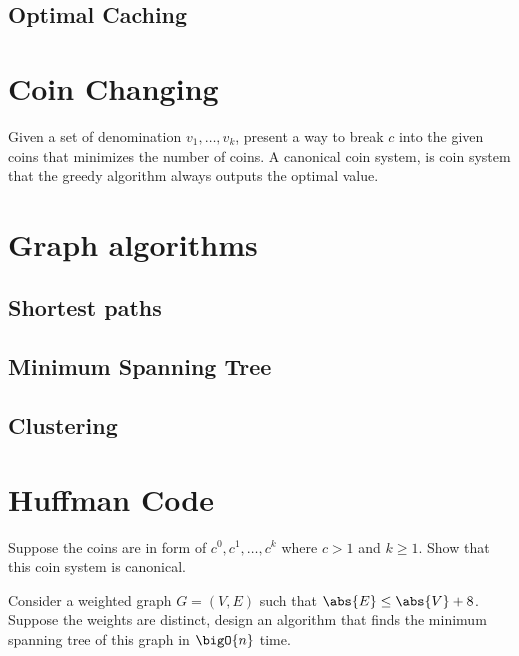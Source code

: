 \subsection*{Optimal Caching}

\section*{Coin Changing}
Given a set of denomination \(v_1, \dots, v_k\), present a way to break \(c\) into the given coins that minimizes the number of coins. A canonical coin system, is coin system that the greedy algorithm always outputs the optimal value. 
\section*{Graph algorithms}
\subsection*{Shortest paths}
\subsection*{Minimum Spanning Tree}
\subsection*{Clustering}
\section*{Huffman Code}
\begin{exercise}

\item Suppose the coins are in form of \(c^0, c^1, \dots, c^k\) where \(c > 1\) and \(k \geq 1\). Show that this coin system is canonical.
\item Consider a weighted graph \(G=(V,E)\) such that \(\abs{E} \leq \abs{V} + 8\). Suppose the weights are distinct, design an algorithm that finds the minimum spanning tree of this graph in \(\bigO{n}\) time.
\end{exercise}